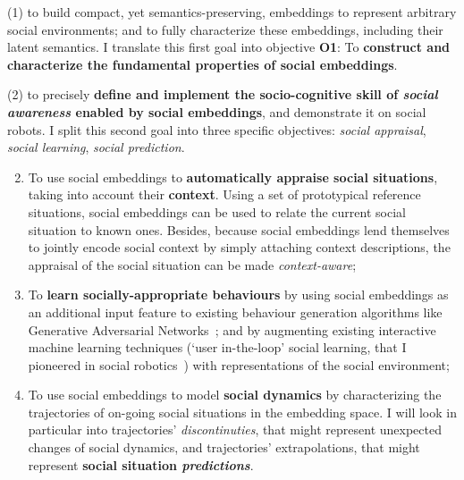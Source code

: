 (1) to build compact, yet semantics-preserving, embeddings to represent
arbitrary social environments; and to fully characterize these embeddings,
including their latent semantics. I translate this first goal into objective
{\bf O1}: To \textbf{construct and characterize the fundamental
properties of social embeddings}.

(2) to precisely \textbf{define and implement the socio-cognitive skill of \emph{social awareness} enabled
by social embeddings}, and demonstrate it on social robots. I split this second
goal into three specific objectives: \emph{social appraisal}, \emph{social
learning}, \emph{social prediction}.



\begin{enumerate}[label=\textbf{O\arabic*}]
    \setcounter{enumi}{1}
    \item \label{T5} To use social embeddings to \textbf{automatically appraise
        social situations}, taking into account their \textbf{context}. Using
        a set of prototypical reference situations, social embeddings
        can be used to relate the current social situation to known ones.
        Besides, because social embeddings lend themselves to jointly encode
        social context by simply attaching context descriptions, the appraisal
        of the social situation can be made \emph{context-aware};

    \item \label{T4} To \textbf{learn socially-appropriate behaviours} by using
        social embeddings as an additional input feature to existing behaviour
        generation algorithms like Generative Adversarial
        Networks~\cite{marmpena2019generating,suguitan2020moveae}; and by
        augmenting existing interactive machine learning techniques (`user
        in-the-loop' social learning, that I pioneered in social
        robotics~\cite{senft2017supervised, winkle2020couch,winkle2021leador})
        with representations of the social environment;

    \item \label{T2} To use social embeddings to model \textbf{social dynamics}
        by characterizing the trajectories of on-going social situations in the
        embedding space. I will look in particular into trajectories'
        \emph{discontinuties}, that might represent unexpected changes of social
        dynamics, and trajectories' extrapolations, that might represent
        \textbf{social situation \emph{predictions}}.

\end{enumerate}


